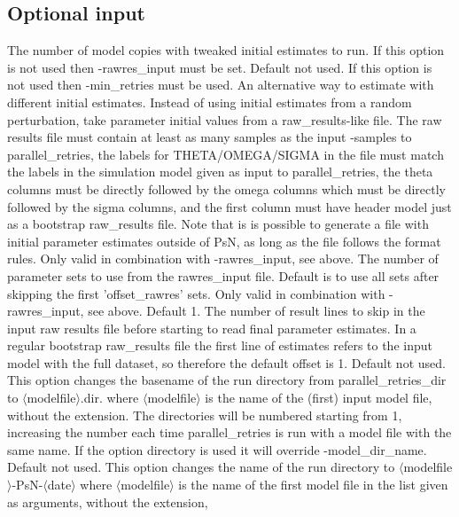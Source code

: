 \subsection{Optional input}
\begin{optionlist}
The number of model copies with tweaked initial estimates to run. 
If this option is not used then -rawres\_input must be set.
\nextopt
{}
Default not used. If this option is not used then -min\_retries must be used.
An alternative way to estimate with different initial estimates. 
Instead of using initial estimates from a random perturbation, take parameter initial values from a raw\_results-like file.
The raw results file must contain at least as many samples as the input -samples to parallel\_retries, the labels for  THETA/OMEGA/SIGMA 
in the file must match the labels in the simulation model given as input to parallel\_retries, 
the theta columns must be directly followed by the omega columns which must be directly followed by the sigma columns, and the first column 
must have header model just as a bootstrap raw\_results file. Note that is is possible to generate a file with initial parameter estimates outside of PsN, 
as long as the file follows the format rules.
\nextopt
{}
Only valid in combination with -rawres\_input, see above. The number of
parameter sets to use from the rawres\_input file. 
Default is to use all sets after skipping the first 'offset\_rawres' sets.
\nextopt
{}
Only valid in combination with -rawres\_input, see above. Default 1.
The number of result lines to skip in the input raw results file before starting to read final parameter estimates. In a regular
bootstrap raw\_results file the first line of estimates refers to the input model with the full dataset, so therefore the default offset is 1.
\nextopt
{}
Default not used. This option changes the basename of the run directory from 
parallel\_retries\_dir to $\langle$modelfile$\rangle$.dir. where $\langle$modelfile$\rangle$ 
is the name of the (first) input model file, without the extension. 
The directories will be numbered starting from 1, increasing the number each time parallel\_retries 
is run with a model file with the 
same name. If the option directory is used it will override -model\_dir\_name.
\nextopt
{}
Default not used. This option changes the name of the run directory to $\langle$modelfile$\rangle$-PsN-$\langle$date$\rangle$
where $\langle$modelfile$\rangle$ is the name of the first model file in the list given as arguments, without the extension,

\end{optionlist}
